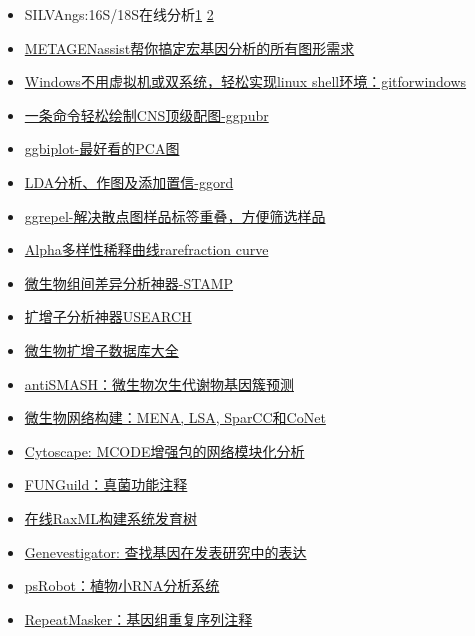 \documentclass[]{article}
\providecommand{\tightlist}{%
  \setlength{\itemsep}{0pt}\setlength{\parskip}{0pt}}
\numberwithin{figure}{section}
\numberwithin{table}{section}
\begin{document}
\begin{itemize}
\tightlist
\item
  SILVAngs:16S/18S在线分析\href{http://mp.weixin.qq.com/s/R4fzOl1JX097rxi18vfePw}{1} \href{http://mp.weixin.qq.com/s/2mv_w-RG50v54iojii7kuA}{2}
\item
  \href{http://mp.weixin.qq.com/s/kVrMGI8mtkJkltCpAbwUiw}{METAGENassist帮你搞定宏基因分析的所有图形需求}
\item
  \href{http://mp.weixin.qq.com/s/GYa5_0bcZO6Pfq-qim5vyA}{Windows不用虚拟机或双系统，轻松实现linux shell环境：gitforwindows}
\item
  \href{http://mp.weixin.qq.com/s/EvlnWBI5OZOudWd0cieGJg}{一条命令轻松绘制CNS顶级配图-ggpubr}
\item
  \href{http://mp.weixin.qq.com/s/GGCPxQEe_DXefdp-veQtag}{ggbiplot-最好看的PCA图}
\item
  \href{https://mp.weixin.qq.com/s/F9c_ISpOpjHyiCNahoYTqQ}{LDA分析、作图及添加置信-ggord}
\item
  \href{http://mp.weixin.qq.com/s/hxBAlnK_1ZSGJQg1mwsssw}{ggrepel-解决散点图样品标签重叠，方便筛选样品}
\item
  \href{http://mp.weixin.qq.com/s/pQluUR7MYSZCheqVvAaNWA}{Alpha多样性稀释曲线rarefraction curve}
\item
  \href{http://mp.weixin.qq.com/s/f02mPAXCobPQijkIis-c2w}{微生物组间差异分析神器-STAMP}\\
\item
  \href{http://mp.weixin.qq.com/s/oJDfShs7gXCkOzYfa_winQ}{扩增子分析神器USEARCH}
\item
  \href{http://mp.weixin.qq.com/s/DL7e6ihq6QppyW-87COiBg}{微生物扩增子数据库大全}\\
\item
  \href{http://mp.weixin.qq.com/s/0MkmAw7f8uVQihrbUA2Z9Q}{antiSMASH：微生物次生代谢物基因簇预测}\\
\item
  \href{http://mp.weixin.qq.com/s/YPZar_aDmKE4W9s45NvhgQ}{微生物网络构建：MENA, LSA, SparCC和CoNet}\\
\item
  \href{https://mp.weixin.qq.com/s/jGHuP1ikCX0n3vKfS3VXPQ}{Cytoscape: MCODE增强包的网络模块化分析}
\item
  \href{http://mp.weixin.qq.com/s/pO3VCMLwEFLlcEgMQsUjDg}{FUNGuild：真菌功能注释}
\item
  \href{http://mp.weixin.qq.com/s/AWfT2szILVrCr25g0EdgvA}{在线RaxML构建系统发育树}
\item
  \href{https://mp.weixin.qq.com/s/mHBH-ooJ9vBpv0nvRFuF3A}{Genevestigator: 查找基因在发表研究中的表达}
\item
  \href{http://mp.weixin.qq.com/s/drpMN55hfbVwHbLYXC0oUw}{psRobot：植物小RNA分析系统}\\
\item
  \href{http://mp.weixin.qq.com/s/vVamtB4mBAauqjpEFBg70A}{RepeatMasker：基因组重复序列注释}
\end{itemize}
\end{document}
